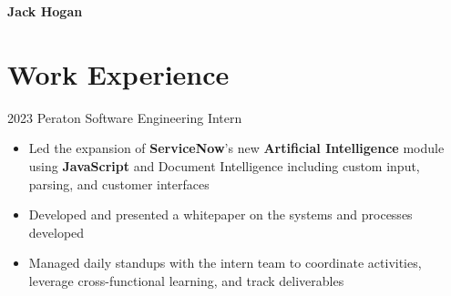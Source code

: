 \documentclass[
	10pt, %
]{FreemanCV}
\begin{document}
\begin{paracol}{2} %



\parbox[][0.11\textheight][c]{\linewidth}{ %

	{\sffamily\Huge \textbf{Jack Hogan}} %



}


\section{Work Experience}





\jobentry
	{2023} %
	{} %
	{Peraton} %
	{Software Engineering Intern} %
	{\vspace{-7mm}\begin{itemize}
		\item Led the expansion of \textbf{ServiceNow}'s new \textbf{Artificial Intelligence} module\\ using \textbf{JavaScript} and Document Intelligence including custom input,\\ parsing, and customer interfaces
		\item Developed and presented a whitepaper on the systems and processes\\ developed
		\item Managed daily standups with the intern team to coordinate activities,\\ leverage cross-functional learning, and track deliverables
	\end{itemize}} %


\end{paracol}
\end{document}
